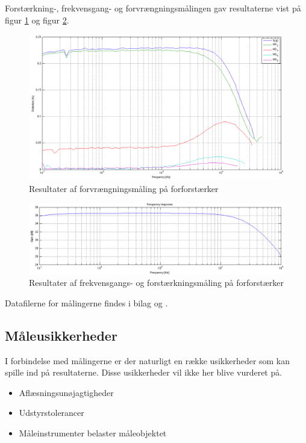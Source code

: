 Forstærkning-, frekvensgang- og forvrængningsmålingen gav resultaterne vist på figur \ref{fig:thdresultat-forforstaerker} og figur \ref{fig:fresultat-forforstaerker}.

\begin{figure}[h]
\centering
\includegraphics[width=\textwidth]{maalerapporter/forforstaerker/thd-forforstaerker.png}
\caption{Resultater af forvrængningsmåling på forforstærker}
\label{fig:thdresultat-forforstaerker}
\end{figure}

\begin{figure}[h]
\centering
\includegraphics[width=\textwidth]{maalerapporter/forforstaerker/frekvensrespons-forforstaerker.png}
\caption{Resultater af frekvensgangs- og forstærkningsmåling på forforstærker}
\label{fig:fresultat-forforstaerker}
\end{figure}

Datafilerne for målingerne findes i bilag \cite{forforstaerker-3.16mvInputTHDogFrekvensRespons} %
og 
\cite{forforstaerker-31.6mvInputTHDogFrekvensRespons}.%

\subsection*{Måleusikkerheder}
I forbindelse med målingerne er der naturligt en række usikkerheder som kan spille ind på resultaterne. Disse usikkerheder vil ikke her blive vurderet på. 

\begin{itemize}
\item Aflæsningsunøjagtigheder
\item Udstyrstolerancer
\item Måleinstrumenter belaster måleobjektet
\end{itemize}